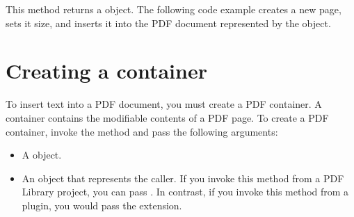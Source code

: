 \documentclass[letterpaper,12pt,english,openany,oneside]{sphinxmanual}
\begin{document}
This method returns a  object. The following code example creates a new page, sets it size, and inserts it into the PDF document represented by the  object.

\begin{sphinxVerbatim}[commandchars=\\\{\}]
 
 

   
  
  
  
  

         
    
\end{sphinxVerbatim}


\section{Creating a container}
\label{\detokenize{Plugins_Insertext:creating-a-container}}
To insert text into a PDF document, you must create a PDF container. A container contains the modifiable contents of a PDF page. To create a PDF container, invoke the  method and pass the following arguments:
\begin{itemize}
\item {} 
A  object.

\item {} 
An  object that represents the caller. If you invoke this method from a PDF Library project, you can pass . In contrast, if you invoke this method from a plugin, you would pass the  extension.

\end{itemize}
\end{document}
